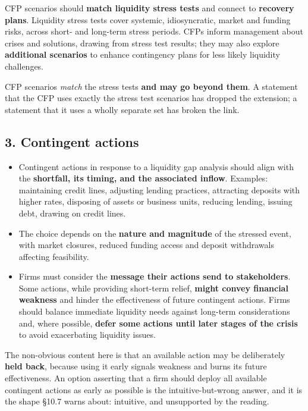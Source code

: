 CFP scenarios should \textbf{match liquidity stress tests} and connect to \textbf{recovery plans}. Liquidity stress tests cover systemic, idiosyncratic, market and funding risks, across short- and long-term stress periods. CFPs inform management about crises and solutions, drawing from stress test results; they may also explore \textbf{additional scenarios} to enhance contingency plans for less likely liquidity challenges.

\begin{lrtrapbox}
CFP scenarios \emph{match} the stress tests \textbf{and may go beyond them}. A statement that the CFP uses exactly the stress test scenarios has dropped the extension; a statement that it uses a wholly separate set has broken the link.
\end{lrtrapbox}

\subsection{3. Contingent actions}

\begin{itemize}
\item Contingent actions in response to a liquidity gap analysis should align with the \textbf{shortfall, its timing, and the associated inflow}. Examples: maintaining credit lines, adjusting lending practices, attracting deposits with higher rates, disposing of assets or business units, reducing lending, issuing debt, drawing on credit lines.
\item The choice depends on the \textbf{nature and magnitude} of the stressed event, with market closures, reduced funding access and deposit withdrawals affecting feasibility.
\item Firms must consider the \textbf{message their actions send to stakeholders}. Some actions, while providing short-term relief, \textbf{might convey financial weakness} and hinder the effectiveness of future contingent actions. Firms should balance immediate liquidity needs against long-term considerations and, where possible, \textbf{defer some actions until later stages of the crisis} to avoid exacerbating liquidity issues.
\end{itemize}

\begin{lrtrapbox}
The non-obvious content here is that an available action may be deliberately \textbf{held back}, because using it early signals weakness and burns its future effectiveness. An option asserting that a firm should deploy all available contingent actions as early as possible is the intuitive-but-wrong answer, and it is the shape \S10.7 warns about: intuitive, and unsupported by the reading.
\end{lrtrapbox}

